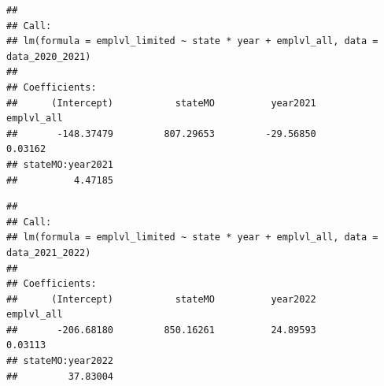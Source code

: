 \documentclass[
]{article}
\newenvironment{Shaded}{\begin{snugshade}}{\end{snugshade}}
\newcommand{\AttributeTok}[1]{\textcolor[rgb]{0.13,0.29,0.53}{#1}}
\newcommand{\CommentTok}[1]{\textcolor[rgb]{0.56,0.35,0.01}{\textit{#1}}}
\newcommand{\DecValTok}[1]{\textcolor[rgb]{0.00,0.00,0.81}{#1}}
\newcommand{\FloatTok}[1]{\textcolor[rgb]{0.00,0.00,0.81}{#1}}
\newcommand{\FunctionTok}[1]{\textcolor[rgb]{0.13,0.29,0.53}{\textbf{#1}}}
\newcommand{\NormalTok}[1]{#1}
\newcommand{\OtherTok}[1]{\textcolor[rgb]{0.56,0.35,0.01}{#1}}
\newcommand{\SpecialCharTok}[1]{\textcolor[rgb]{0.81,0.36,0.00}{\textbf{#1}}}
\begin{document}
\begin{verbatim}
## 
## Call:
## lm(formula = emplvl_limited ~ state * year + emplvl_all, data = data_2020_2021)
## 
## Coefficients:
##      (Intercept)           stateMO          year2021        emplvl_all  
##       -148.37479         807.29653         -29.56850           0.03162  
## stateMO:year2021  
##          4.47185
\end{verbatim}

\begin{Shaded}
\end{Shaded}

\begin{verbatim}
## 
## Call:
## lm(formula = emplvl_limited ~ state * year + emplvl_all, data = data_2021_2022)
## 
## Coefficients:
##      (Intercept)           stateMO          year2022        emplvl_all  
##       -206.68180         850.16261          24.89593           0.03113  
## stateMO:year2022  
##         37.83004
\end{verbatim}
\end{document}
